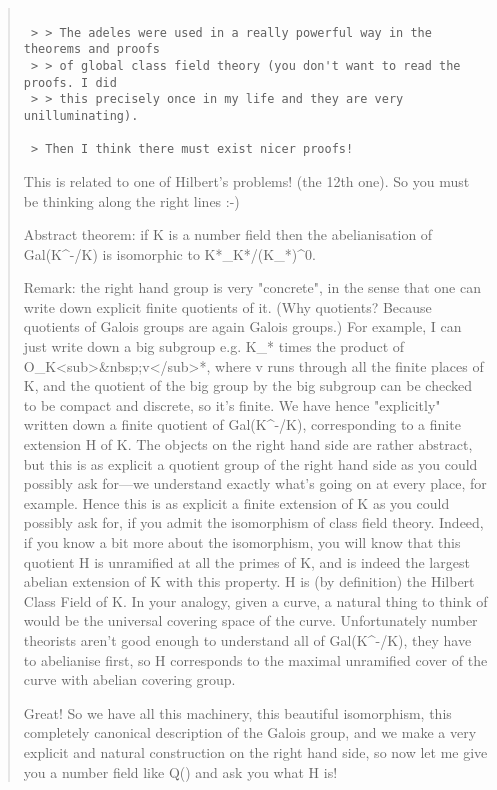\begin{quote}

\begin{verbatim}

 > > The adeles were used in a really powerful way in the theorems and proofs
 > > of global class field theory (you don't want to read the proofs. I did
 > > this precisely once in my life and they are very unilluminating).

 > Then I think there must exist nicer proofs!
\end{verbatim}
    

 This is related to one of Hilbert's problems! (the 12th one). So you must
 be thinking along the right lines :-)

 Abstract theorem: if K is a number field then the abelianisation of
 Gal(K^{-}/K) is isomorphic to K*\Adeles_{K}*/(K_{\infty }*)^{0}.

 Remark: the right hand group is very "concrete", 
 in the sense that one can
 write down explicit finite quotients of it. (Why quotients? Because quotients
 of Galois groups are again Galois groups.) For example, I can
 just write down a big subgroup e.g. K_{\infty }* times the product of
 O_{K<sub>&nbsp;v}</sub>*, where v runs through all the finite places of K, and the
 quotient of the big group by the big subgroup can be checked to be compact
 and discrete, so it's finite. We have hence "explicitly" written down a
 finite quotient of Gal(K^{-}/K), corresponding to a finite extension H of K.
 The objects on the right hand side are rather abstract, but this is as
 explicit a quotient group of the right hand side as you could possibly ask for---we
 understand exactly what's going on at every place, for example. Hence this
 is as explicit a finite extension of K as you could possibly ask for, if
 you admit the isomorphism of class field theory. Indeed, if you know a bit
 more about the isomorphism, you will know that this quotient H is
 unramified at all the primes of K, and is indeed the largest
 abelian extension of K with this property. H is (by definition) the
 Hilbert Class Field of K. In your analogy, given a curve, a natural thing
 to think of would be the universal covering space of the curve.
 Unfortunately number theorists aren't good enough to understand all of
 Gal(K^{-}/K), they have to abelianise first, so H corresponds to the
 maximal unramified cover of the curve with abelian covering group.
 
 Great! So we have all this machinery, this beautiful isomorphism, this
 completely canonical description of the Galois group, and we make a very
 explicit and natural construction on the right hand side, so now let me
 give you a number field like Q() and ask you what H is!


\end{quote}
